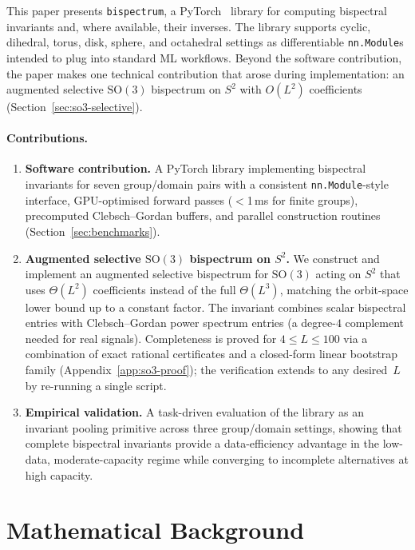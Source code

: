 \documentclass{article}
\theoremstyle{definition}
\theoremstyle{remark}
\newcommand{\SO}{\mathrm{SO}}
\theoremstyle{definition}
\begin{document}
This paper presents \texttt{bispectrum}, a PyTorch~\citep{paszke2019pytorch}
library for computing bispectral invariants and, where available, their
inverses. The library
supports cyclic, dihedral, torus, disk, sphere, and octahedral settings as
differentiable \texttt{nn.Module}s intended to plug into standard ML workflows.
Beyond the software contribution, the paper makes one technical contribution
that arose during implementation: an augmented selective $\SO(3)$
bispectrum on $S^2$ with $O(L^2)$ coefficients
(Section~\ref{sec:so3-selective}).

\paragraph{Contributions.}
\begin{enumerate}
  \item \textbf{Software contribution.} A PyTorch library implementing
    bispectral invariants for seven group/domain pairs with a consistent
    \texttt{nn.Module}-style interface, GPU-optimised forward passes
    ($<$1\,ms for finite groups), precomputed Clebsch--Gordan buffers,
    and parallel construction routines
    (Section~\ref{sec:benchmarks}).
  \item \textbf{Augmented selective $\SO(3)$ bispectrum on $S^2$.} We construct
    and implement an augmented selective bispectrum for $\SO(3)$ acting on
    $S^2$ that uses
    $\Theta(L^2)$ coefficients instead of the full $\Theta(L^3)$,
    matching the orbit-space lower bound up to a constant factor.
    The invariant combines scalar bispectral entries with
    Clebsch--Gordan power spectrum entries (a degree-$4$ complement
    needed for real signals).  Completeness is proved for $4 \le L \le 100$
    via a combination of exact rational certificates and a
    closed-form linear bootstrap family (Appendix~\ref{app:so3-proof});
    the verification extends to any desired~$L$ by re-running a single script.
  \item \textbf{Empirical validation.} A task-driven evaluation of the
    library as an invariant pooling primitive across three group/domain
    settings, showing that complete bispectral invariants provide a
    data-efficiency advantage in the low-data, moderate-capacity regime
    while converging to incomplete alternatives at high capacity.
\end{enumerate}

\section{Mathematical Background}
\label{sec:background}
\end{document}
